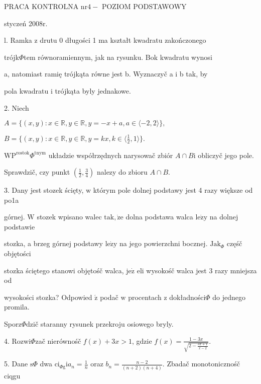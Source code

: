 \documentclass[a4paper,12pt]{article}
\begin{document}
PRACA KONTROLNA $\mathrm{n}\mathrm{r}4-$ POZIOM PODSTAWOWY

styczeń 2008r.

l. Ramka z drutu 0 długości 1 ma kształt kwadratu zakończonego

trójk$\Phi$tem równoramiennym, jak na rysunku. Bok kwadratu wynosi

a, natomiast ramię trójkąta równe jest b. Wyznaczyč a i b tak, by

pola kwadratu i trójkąta byly jednakowe.

2. Niech

$A=\{(x,y):x\in \mathbb{R},y\in \mathbb{R},y=-x+a,a\in\langle-2,2\rangle\},$

$B=\displaystyle \{(x,y):x\in \mathbb{R},y\in \mathbb{R},y=kx,k\in\langle\frac{1}{2},1\rangle\}.$

$\mathrm{W}\mathrm{P}^{\mathrm{r}\mathrm{o}\mathrm{s}\mathrm{t}\mathrm{o}\mathrm{k}}\Phi^{\mathrm{t}\mathrm{n}\mathrm{y}\mathrm{m}}$ układzie współrzędnych narysowač zbiór $A\cap B\mathrm{i}$ obliczyč jego pole.

Sprawdzič, czy punkt $(\displaystyle \frac{1}{2},\frac{3}{4})$ nalezy do zbioru $A\cap B.$

3. Dany jest stozek ścięty, $\mathrm{w}$ którym pole dolnej podstawy jest 4 razy większe od po1a

górnej. $\mathrm{W}$ stozek wpisano walec $\mathrm{t}\mathrm{a}\mathrm{k}, \dot{\mathrm{z}}\mathrm{e}$ dolna podstawa walca $\mathrm{l}\mathrm{e}\dot{\mathrm{z}}\mathrm{y}$ na dolnej podstawie

stozka, a brzeg górnej podstawy $\mathrm{l}\mathrm{e}\dot{\mathrm{z}}\mathrm{y}$ na jego powierzchni bocznej. $\mathrm{J}\mathrm{a}\mathrm{k}_{\Phi}$ częśč objętości

stozka ściętego stanowi objętośč walca, $\mathrm{j}\mathrm{e}\dot{\mathrm{z}}$ eli wysokośč walca jest 3 razy mniejsza od

wysokości stozka? Odpowied $\acute{\mathrm{z}}$ podač $\mathrm{w}$ procentach $\mathrm{z}$ dokładności$\Phi$ do jednego promila.

Sporz$\Phi$dzič staranny rysunek przekroju osiowego bryly.

4. Rozwi$\Phi$zač nierównośč $f(x)+3x>1$, gdzie $f(x)=\displaystyle \frac{1-3x}{\sqrt{2-\frac{3x+1}{x-2}}}.$

5. Dane $\mathrm{s}\Phi$ dwa $\displaystyle \mathrm{c}\mathrm{i}_{\Phi \mathrm{g}}\mathrm{i}a_{n}=\frac{1}{n}$ oraz $b_{n}=\displaystyle \frac{n-2}{(n+2)(n+4)}$. Zbadač monotonicznośč ciqgu
\end{document}
